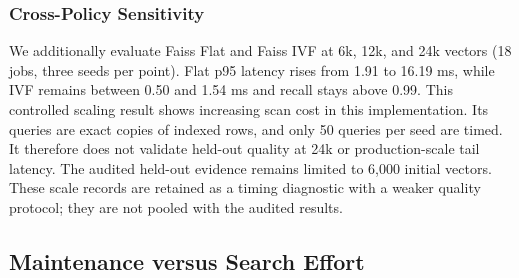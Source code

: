 \subsubsection{Cross-Policy Sensitivity}
We additionally evaluate Faiss Flat and Faiss IVF at 6k, 12k, and 24k vectors (18 jobs,
three seeds per point). Flat p95 latency rises from 1.91 to 16.19 ms, while IVF remains
between 0.50 and 1.54 ms and recall stays above 0.99. This controlled scaling result
shows increasing scan cost in this implementation. Its queries are exact copies of
indexed rows, and only 50 queries per seed are timed. It therefore does not validate
held-out quality at 24k or production-scale tail latency. The audited held-out evidence
remains limited to 6,000 initial vectors. These scale records are retained as a timing
diagnostic with a weaker quality protocol; they are not pooled with the audited results.
\subsection{Maintenance versus Search Effort}
